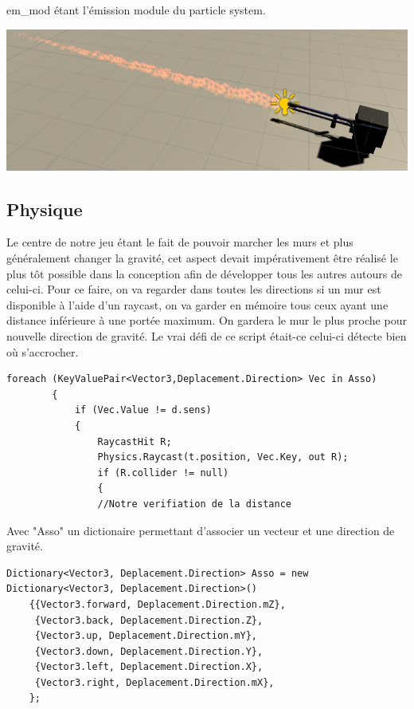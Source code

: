 ﻿\documentclass{article}
\begin{document}
em\_mod étant l'émission module du particle system.

\centerline{\includegraphics[scale=1.0]{flamethrower.png}}

\subsection {Physique}

Le centre de notre jeu étant le fait de pouvoir marcher les murs et plus 
généralement changer la gravité, cet aspect devait impérativement être 
réalisé le plus tôt possible dans la conception afin de développer tous 
les autres autours de celui-ci. Pour ce faire, on va regarder dans toutes 
les directions si un mur est disponible à l'aide d'un raycast, on va garder 
en mémoire tous ceux ayant une distance inférieure à une portée maximum.
On gardera le mur le plus proche pour nouvelle direction de gravité.
Le vrai défi de ce script était-ce celui-ci détecte bien où s'accrocher.

\begin{verbatim}
foreach (KeyValuePair<Vector3,Deplacement.Direction> Vec in Asso)
        {
            if (Vec.Value != d.sens)
            {
                RaycastHit R;
                Physics.Raycast(t.position, Vec.Key, out R);
                if (R.collider != null)
                { 
				//Notre verifiation de la distance
\end{verbatim}
				
Avec "Asso" un dictionaire permettant d'associer un vecteur et une direction de gravité.

\begin{verbatim}
Dictionary<Vector3, Deplacement.Direction> Asso = new Dictionary<Vector3, Deplacement.Direction>()
    {{Vector3.forward, Deplacement.Direction.mZ},
     {Vector3.back, Deplacement.Direction.Z},
     {Vector3.up, Deplacement.Direction.mY},
     {Vector3.down, Deplacement.Direction.Y},
     {Vector3.left, Deplacement.Direction.X},
     {Vector3.right, Deplacement.Direction.mX},
    };
\end{verbatim}
		
\end{document}
